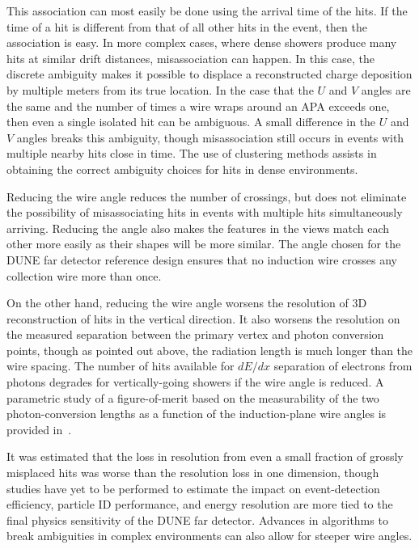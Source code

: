 This association can most easily be done using the arrival time of the
hits.  If the time of a hit is different from that of all other hits
in the event, then the association is easy.  In more complex cases,
where dense showers produce many hits at similar drift distances,
misassociation can happen.  In this case, %
the discrete ambiguity makes it possible to displace a reconstructed
charge deposition by multiple meters from its true location.  In the
case that the $U$ and $V$ angles are the same and the number of times
a wire wraps around an APA exceeds one, then even a single isolated
hit can be ambiguous.  A small difference in the $U$ and $V$ angles
breaks this ambiguity, though misassociation still occurs in events
with multiple nearby hits close in time.  The use of clustering methods
assists in obtaining the correct ambiguity choices for hits in dense
environments.

Reducing the wire angle reduces the number of crossings, but does not
eliminate the possibility of misassociating hits %
in events with
multiple hits simultaneously arriving.  Reducing the angle also makes
the features in the views match each other more easily as their shapes
will be more similar.
The angle
chosen for the DUNE far detector reference design ensures that no
induction wire crosses any collection wire more than once.

On the other hand, reducing the wire angle worsens the resolution of
3D reconstruction of hits in the vertical direction. 
It also worsens the resolution on the measured separation between the
primary vertex and photon conversion points, though as pointed out
above, the radiation length is much longer than the wire spacing.  
The
number of hits available for $dE/dx$ separation of electrons from
photons degrades for vertically-going showers if the wire angle is
reduced.  A parametric study of a figure-of-merit based on the
measurability of the two photon-conversion lengths as a function of
the induction-plane wire angles is provided
in~\cite{wire-orientation}.

It was estimated that the loss in resolution from even a small fraction
of grossly misplaced hits %
was worse than the resolution loss in one
dimension\cite{docdb-8981}, though studies have yet to be performed
to estimate the impact on event-detection efficiency,
particle ID performance, and energy resolution are more tied to the
final physics sensitivity of the DUNE far detector.   %
Advances in algorithms to break ambiguities in complex environments can also allow
for steeper wire angles.

